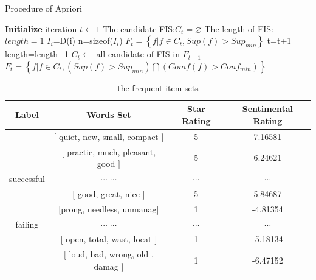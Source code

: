 \documentclass[12pt]{article}%
\begin{document}
\begin{algorithm}[H]
	\caption{Procedure of Apriori}  
	\LinesNumbered  
	\textbf{Initialize} \newline
	iteration $t\leftarrow 1$ \newline
	The candidate FIS:$C_{t}=\varnothing$ \newline
	The length of FIS:$length=1$ \newline
	{$I_{i}$=D(i)\newline
		n=sizeof($I_{i}$)\newline
	}
	$F_{t}=\left \{ f|f\in C_{t},Sup(f)>Sup_{min}\right \}$\newline
	{ t=t+1\newline 
		length=length+1\newline	
		$C_{t}\leftarrow $ all candidate of FIS in $F_{t-1}$\newline
		$F_{t}=\left \{ f|f\in C_{t},(Sup(f)>Sup_{min})\bigcap (Comf(f)>Conf_{min}) \right\}$\newline
	}	
\end{algorithm} 
\begin{table}[H]
	\centering
	\caption{the frequent item sets}	
	\begin{tabular}{c|ccc}
		\toprule[1.5pt]
		\multicolumn{1}{m{2cm}}{\centering Label} &
		\multicolumn{1}{m{6cm}}{\centering Words Set} & \multicolumn{1}{m{2cm}}{\centering Star Rating}&
		\multicolumn{1}{m{2cm}}{\centering  Sentimental Rating}\\
		\midrule[1pt]
		&$\big [$ quiet, new, small, compact $\big ]$ &5&7.16581\\
		&$\big [$ practic, much, pleasant, good $\big ]$ &5&6.24621\\
		successful	 	&$\cdots$ $\cdots$&$\cdots$&$\cdots$\\
		&$\big [$ good, great, nice $\big ]$ &5&5.84687\\
		\midrule[1pt]
		&$\big [$prong, needless, unmanag$\big ]$ &1&-4.81354\\
		failing				 	&$\cdots$ $\cdots$&$\cdots$&$\cdots$\\
		&$\big [$ open, total, wast, locat $\big ]$ &1&-5.18134\\
		&$\big [$ loud, bad, wrong, old , damag $\big ]$ &1&-6.47152\\
		\bottomrule[1.6pt]
	\end{tabular}
\end{table}
\end{document}
